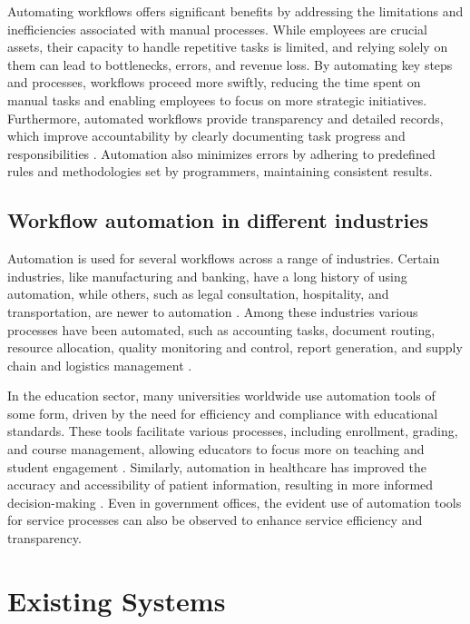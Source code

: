 Automating workflows offers significant benefits by addressing the limitations and inefficiencies associated with manual processes. While employees are crucial assets, their capacity to handle repetitive tasks is limited, and relying solely on them can lead to bottlenecks, errors, and revenue loss. By automating key steps and processes, workflows proceed more swiftly, reducing the time spent on manual tasks and enabling employees to focus on more strategic initiatives. Furthermore, automated workflows provide transparency and detailed records, which improve accountability by clearly documenting task progress and responsibilities \cite{awati2024}. Automation also minimizes errors by adhering to predefined rules and methodologies set by programmers, maintaining consistent results.

\subsection{Workflow automation in different industries}

Automation is used for several workflows across a range of industries. Certain industries, like manufacturing and banking, have a long history of using automation, while others, such as legal consultation, hospitality, and transportation, are newer to automation \cite{caban2021}. Among these industries various processes have been automated, such as accounting tasks, document routing, resource allocation, quality monitoring and control, report generation, and supply chain and logistics management \cite{aguirre2017, mcquilken2014}.

In the education sector, many universities worldwide use automation tools of some form, driven by the need for efficiency and compliance with educational standards. These tools facilitate various processes, including enrollment, grading, and course management, allowing educators to focus more on teaching and student engagement \cite{choudhary2024}. Similarly, automation in healthcare has improved the accuracy and accessibility of patient information, resulting in more informed decision-making \cite{gupta2020}. Even in government offices, the evident use of automation tools for service processes can also be observed to enhance service efficiency and transparency. 

\section{Existing Systems}

